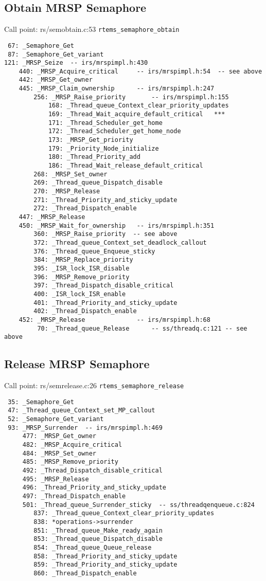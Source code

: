 \subsection{Obtain MRSP Semaphore}

Call point: rs/semobtain.c:53 \verb"rtems_semaphore_obtain"
\begin{verbatim}
 67: _Semaphore_Get
 87: _Semaphore_Get_variant
121: _MRSP_Seize  -- irs/mrspimpl.h:430
    440: _MRSP_Acquire_critical     -- irs/mrspimpl.h:54  -- see above
    442: _MRSP_Get_owner
    445: _MRSP_Claim_ownership      -- irs/mrspimpl.h:247
        256: _MRSP_Raise_priority       -- irs/mrspimpl.h:155
            168: _Thread_queue_Context_clear_priority_updates
            169: _Thread_Wait_acquire_default_critical   ***
            171: _Thread_Scheduler_get_home
            172: _Thread_Scheduler_get_home_node
            173: _MRSP_Get_priority
            179: _Priority_Node_initialize
            180: _Thread_Priority_add
            186: _Thread_Wait_release_default_critical
        268: _MRSP_Set_owner
        269: _Thread_queue_Dispatch_disable
        270: _MRSP_Release
        271: _Thread_Priority_and_sticky_update
        272: _Thread_Dispatch_enable
    447: _MRSP_Release
    450: _MRSP_Wait_for_ownership   -- irs/mrspimpl.h:351
        360: _MRSP_Raise_priority  -- see above
        372: _Thread_queue_Context_set_deadlock_callout
        376: _Thread_queue_Enqueue_sticky
        384: _MRSP_Replace_priority
        395: _ISR_lock_ISR_disable
        396: _MRSP_Remove_priority
        397: _Thread_Dispatch_disable_critical
        400: _ISR_lock_ISR_enable
        401: _Thread_Priority_and_sticky_update
        402: _Thread_Dispatch_enable
    452: _MRSP_Release              -- irs/mrspimpl.h:68
         70: _Thread_queue_Release      -- ss/threadq.c:121 -- see above
\end{verbatim}

\subsection{Release MRSP Semaphore}

Call point: rs/semrelease.c:26 \verb"rtems_semaphore_release"
\begin{verbatim}
 35: _Semaphore_Get
 47: _Thread_queue_Context_set_MP_callout
 52: _Semaphore_Get_variant
 93: _MRSP_Surrender  -- irs/mrspimpl.h:469
     477: _MRSP_Get_owner
     482: _MRSP_Acquire_critical
     484: _MRSP_Set_owner
     485: _MRSP_Remove_priority
     492: _Thread_Dispatch_disable_critical
     495: _MRSP_Release
     496: _Thread_Priority_and_sticky_update
     497: _Thread_Dispatch_enable
     501: _Thread_queue_Surrender_sticky  -- ss/threadqenqueue.c:824
        837: _Thread_queue_Context_clear_priority_updates
        838: *operations->surrender
        851: _Thread_queue_Make_ready_again
        853: _Thread_queue_Dispatch_disable
        854: _Thread_queue_Queue_release
        858: _Thread_Priority_and_sticky_update
        859: _Thread_Priority_and_sticky_update
        860: _Thread_Dispatch_enable
\end{verbatim}

